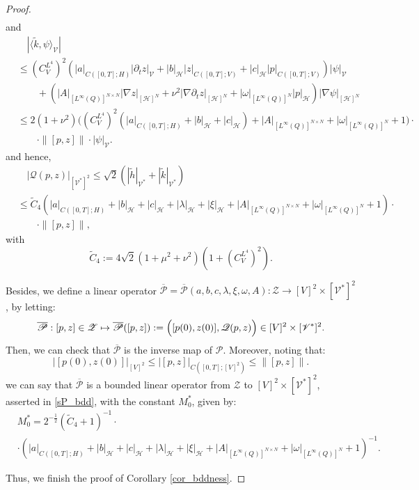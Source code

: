 \documentclass{sinst}
\numberwithin{equation}{section}
\theoremstyle{plain}
\theoremstyle{definition}
\def\sH{\mathscr{H}}
\def\sP{\mathscr{P}}
\def\sQ{\mathscr{Q}}
\def\sV{\mathscr{V}}
\def\sZ{\mathscr{Z}}
\begin{document}
\begin{proof}
\begin{align}
  \end{align}
  and
  \begin{align}
    &\quad|\langle \tilde k,\psi \rangle_\sV| 
    \\
    &\leq (C_V^{L^4})^2(|a|_{C([0,T];H)} |\partial_t z|_\sV + |b|_\sH |z|_{C([0,T];V)} + |c|_\sH |p|_{C([0,T];V)})|\psi|_\sV 
    \\
    &\qquad + (|A|_{[L^\infty(Q)]^{N \times N}} |\nabla z|_{[\sH]^N} + \nu^2 |\nabla \partial_t z|_{[\sH]^N} + |\omega|_{[L^\infty(Q)]^N} |p|_\sH) |\nabla \psi|_{[\sH]^N}
    \\
    &\leq 2 (1 + \nu^2) \bigl( (C_V^{L^4})^2 (|a|_{C([0,T];H)} + |b|_\sH + |c|_\sH) + |A|_{[L^\infty(Q)]^{N \times N}} + |\omega|_{[L^\infty(Q)]^N} + 1\bigr)\cdot 
    \\
    &\qquad \cdot \| [p,z] \| \cdot |\psi|_\sV.
  \end{align}
  and hence,
  \begin{align}
    &\quad |\sQ(p,z)|_{[\sV^*]^2} \leq \sqrt{2}(|\tilde h|_{\sV^*} + |\tilde k|_{\sV^*}) \label{P_bdd_1}
    \\
    &\leq \tilde C_4 (|a|_{C([0,T];H)} + |b|_\sH + |c|_\sH + |\lambda|_\sH + |\xi|_\sH + |A|_{[L^\infty(Q)]^{N \times N}} + |\omega|_{[L^\infty(Q)]^N} + 1) \cdot
    \\
    &\qquad \cdot \| [p,z] \|,
  \end{align}
  with
  \begin{equation}
    \tilde C_4 := 4\sqrt{2} (1 + \mu^2 + \nu^2)(1 + (C_V^{L^4})^2).
  \end{equation}

  Besides, we define a linear operator $\overline{\sP} = \overline{\sP}(a,b,c,\lambda,\xi,\omega,A): \sZ \longrightarrow [V]^2 \times [\sV^*]^2$, by letting:
  \begin{equation}
    \overline{\sP}: [p,z] \in \sZ \mapsto \overline{\sP}([p,z]) := \Bigl( [p(0), z(0)], \sQ(p,z) \Bigr) \in [V]^2 \times [\sV^*]^2.
  \end{equation}
  Then, we can check that $\overline{\sP}$ is the inverse map of $\sP$. Moreover, noting that:
  \begin{equation}
    |[p(0), z(0)]|_{[V]^2} \leq |[p,z]|_{C([0,T];[V]^2)} \leq \|[p,z]\|. \label{P_bdd_2}
  \end{equation}
  we can say that $\overline{\sP}$ is a bounded linear operator from $\sZ$ to $[V]^2 \times [\sV^*]^2$, asserted in \eqref{sP_bdd}, with the constant $M_0^*$, given by:
  \begin{align}
    &M_0^* = 2^{-\frac{1}{2}}(\tilde C_4 + 1)^{-1} \cdot
    \\
    &\cdot (|a|_{C([0,T];H)} + |b|_\sH + |c|_\sH + |\lambda|_\sH + |\xi|_\sH + |A|_{[L^\infty(Q)]^{N \times N}} + |\omega|_{[L^\infty(Q)]^N} + 1)^{-1}.
  \end{align}

  Thus, we finish the proof of Corollary \ref{cor_bddness}.

\end{proof}
\end{document}
